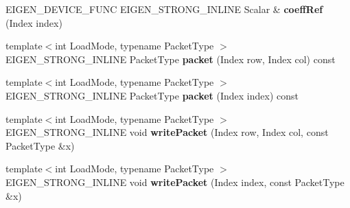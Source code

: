 \begin{DoxyCompactItemize}
E\+I\+G\+E\+N\+\_\+\+D\+E\+V\+I\+C\+E\+\_\+\+F\+U\+NC E\+I\+G\+E\+N\+\_\+\+S\+T\+R\+O\+N\+G\+\_\+\+I\+N\+L\+I\+NE Scalar \& {\bfseries coeff\+Ref} (Index index)
\item 
\mbox{\label{struct_eigen_1_1internal_1_1unary__evaluator_3_01_reverse_3_01_arg_type_00_01_direction_01_4_01_4_a8c92396868ae9b53e8e35baed5fc3812}} 
{\footnotesize template$<$int Load\+Mode, typename Packet\+Type $>$ }\\E\+I\+G\+E\+N\+\_\+\+S\+T\+R\+O\+N\+G\+\_\+\+I\+N\+L\+I\+NE Packet\+Type {\bfseries packet} (Index row, Index col) const
\item 
\mbox{\label{struct_eigen_1_1internal_1_1unary__evaluator_3_01_reverse_3_01_arg_type_00_01_direction_01_4_01_4_abf0fae610f875385e5554b453a100376}} 
{\footnotesize template$<$int Load\+Mode, typename Packet\+Type $>$ }\\E\+I\+G\+E\+N\+\_\+\+S\+T\+R\+O\+N\+G\+\_\+\+I\+N\+L\+I\+NE Packet\+Type {\bfseries packet} (Index index) const
\item 
\mbox{\label{struct_eigen_1_1internal_1_1unary__evaluator_3_01_reverse_3_01_arg_type_00_01_direction_01_4_01_4_a3fdc8a78fe1cecd2694e608b2fda69f4}} 
{\footnotesize template$<$int Load\+Mode, typename Packet\+Type $>$ }\\E\+I\+G\+E\+N\+\_\+\+S\+T\+R\+O\+N\+G\+\_\+\+I\+N\+L\+I\+NE void {\bfseries write\+Packet} (Index row, Index col, const Packet\+Type \&x)
\item 
\mbox{\label{struct_eigen_1_1internal_1_1unary__evaluator_3_01_reverse_3_01_arg_type_00_01_direction_01_4_01_4_a92db75ef72d0d8592961be42fd3cf186}} 
{\footnotesize template$<$int Load\+Mode, typename Packet\+Type $>$ }\\E\+I\+G\+E\+N\+\_\+\+S\+T\+R\+O\+N\+G\+\_\+\+I\+N\+L\+I\+NE void {\bfseries write\+Packet} (Index index, const Packet\+Type \&x)
\end{DoxyCompactItemize}
